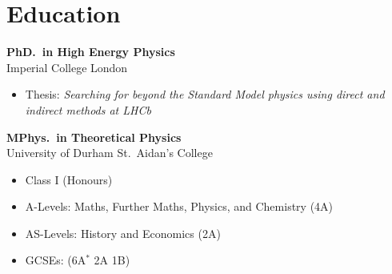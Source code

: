 \section{Education}

{
  \textbf{PhD.~in High Energy Physics} \\
  {Imperial College London {\color{color2} }} \\
  \begin{itemize}
    \item {
      Thesis:
      \textit{Searching for beyond the Standard Model physics using direct and indirect methods at LHCb}
    }
  \end{itemize}
}

\vspace{-1em}

{
  \textbf{MPhys.~in Theoretical Physics} \\
  {University of Durham {\color{color2} St.~Aidan's College}} \\
  \begin{itemize}
    \item Class I (Honours)
  \end{itemize}
}

\vspace{-1em}

{
  \begin{itemize}
    \item A-Levels: Maths, Further Maths, Physics, and Chemistry (4A)
    \item AS-Levels: History and Economics (2A)
    \item GCSEs: (6A$\!^*$ 2A 1B)
  \end{itemize}
}

\vspace{-1em}
